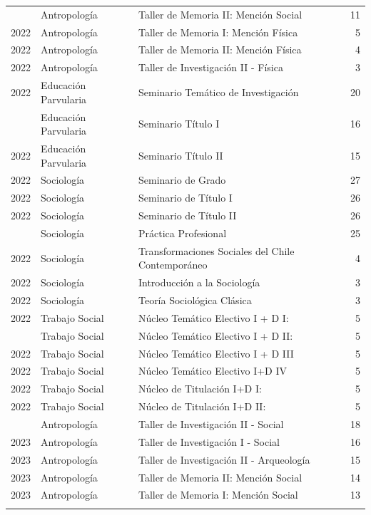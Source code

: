 \documentclass[
  spanish,
  a4paper,
  oneside]{scrbook}
\begin{document}
\begin{longtable}[t]{lllr}
\addlinespace
2022 & Antropología & Taller de Memoria II: Mención Social & 11\\
2022 & Antropología & Taller de Memoria I: Mención Física & 5\\
2022 & Antropología & Taller de Memoria II: Mención Física & 4\\
2022 & Antropología & Taller de Investigación II - Física & 3\\
2022 & Educación Parvularia & Seminario Temático de Investigación & 20\\
\addlinespace
2022 & Educación Parvularia & Seminario Título I & 16\\
2022 & Educación Parvularia & Seminario Título II & 15\\
2022 & Sociología & Seminario de Grado & 27\\
2022 & Sociología & Seminario de Título I & 26\\
2022 & Sociología & Seminario de Título II & 26\\
\addlinespace
2022 & Sociología & Práctica Profesional & 25\\
2022 & Sociología & Transformaciones Sociales del Chile Contemporáneo & 4\\
2022 & Sociología & Introducción a la Sociología & 3\\
2022 & Sociología & Teoría Sociológica Clásica & 3\\
2022 & Trabajo Social & Núcleo Temático Electivo I + D I: & 5\\
\addlinespace
2022 & Trabajo Social & Núcleo Temático Electivo I + D II: & 5\\
2022 & Trabajo Social & Núcleo Temático Electivo I + D III & 5\\
2022 & Trabajo Social & Núcleo Temático Electivo I+D IV & 5\\
2022 & Trabajo Social & Núcleo de Titulación I+D I: & 5\\
2022 & Trabajo Social & Núcleo de Titulación I+D II: & 5\\
\addlinespace
2023 & Antropología & Taller de Investigación II - Social & 18\\
2023 & Antropología & Taller de Investigación I - Social & 16\\
2023 & Antropología & Taller de Investigación II - Arqueología & 15\\
2023 & Antropología & Taller de Memoria II: Mención Social & 14\\
2023 & Antropología & Taller de Memoria I: Mención Social & 13\\
\addlinespace

\end{longtable}
\end{document}
